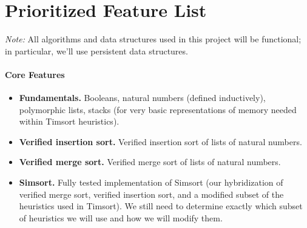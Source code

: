 \documentclass{article}
\begin{document}
\section{Prioritized Feature List}
\emph{Note:} All algorithms and data structures used in this project will
be functional; in particular, we'll use persistent data structures.

\paragraph{Core Features}
\begin{itemize}
  \item \textbf{Fundamentals.}
    Booleans, natural numbers (defined inductively), polymorphic lists,
    stacks (for very basic representations of memory needed within Timsort
    heuristics).
  \item \textbf{Verified insertion sort.}
    Verified insertion sort of lists of natural numbers.
  \item \textbf{Verified merge sort.}
    Verified merge sort of lists of natural numbers.
  \item \textbf{Simsort.}
    Fully tested implementation of Simsort (our hybridization of verified
    merge sort, verified insertion sort, and a modified subset of the
    heuristics used in Timsort).
    We still need to determine exactly which subset of heuristics we will
    use and how we will modify them.

\end{itemize}
\end{document}
